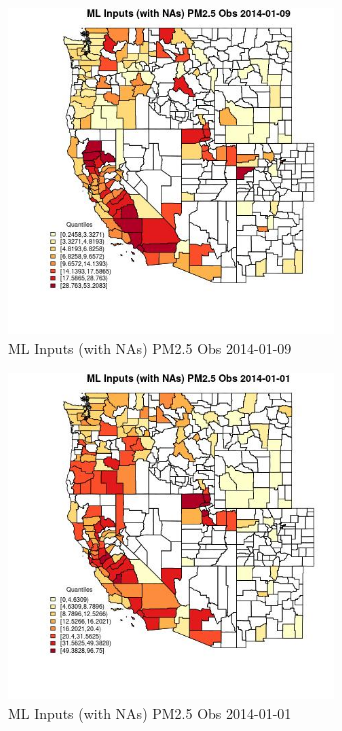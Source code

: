 \begin{figure} 
\centering  
\includegraphics[width=0.77\textwidth]{Code_Outputs/Report_ML_input_PM25_Step4_part_e_de_duplicated_aveswNAs_CountyPM25_ObsMean2014-01-09_2014-01-09.jpg} 
\caption{\label{fig:Report_ML_input_PM25_Step4_part_e_de_duplicated_aveswNAsCountyPM25_ObsMean2014-01-09_2014-01-09}ML Inputs (with NAs) PM2.5 Obs 2014-01-09} 
\end{figure} 
 

\begin{figure} 
\centering  
\includegraphics[width=0.77\textwidth]{Code_Outputs/Report_ML_input_PM25_Step4_part_e_de_duplicated_aveswNAs_CountyPM25_ObsMean2014-01-01_2014-01-01.jpg} 
\caption{\label{fig:Report_ML_input_PM25_Step4_part_e_de_duplicated_aveswNAsCountyPM25_ObsMean2014-01-01_2014-01-01}ML Inputs (with NAs) PM2.5 Obs 2014-01-01} 
\end{figure} 
 

